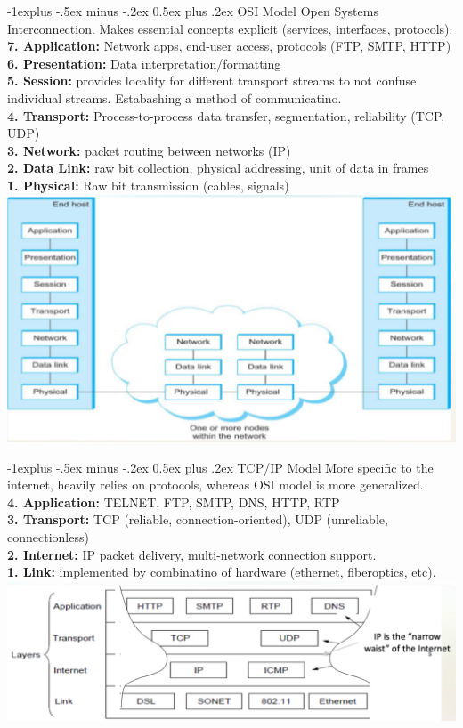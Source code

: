 \documentclass[letterpaper, 8pt]{extarticle}
\makeatletter
\renewcommand{\subsection}{\@startsection{subsection}{2}{0mm}%
                                {-1explus -.5ex minus -.2ex}%
                                {0.5ex plus .2ex}%
                                {\normalfont\small\bfseries}}
\makeatother
\begin{document}
\begin{multicols*}{4}
	\subsection{OSI Model}
	Open Systems Interconnection. Makes essential concepts explicit (services, interfaces, protocols). \\
	\textbf{7. Application:} Network apps, end-user access, protocols (FTP, SMTP, HTTP) \\
	\textbf{6. Presentation:} Data interpretation/formatting \\
	\textbf{5. Session:} provides locality for different transport streams to not confuse individual streams. Estabashing a method of communicatino. \\
	\textbf{4. Transport:} Process-to-process data transfer, segmentation, reliability (TCP, UDP) \\
	\textbf{3. Network:} packet routing between networks (IP) \\
	\textbf{2. Data Link:} raw bit collection, physical addressing, unit of data in frames \\
	\textbf{1. Physical:} Raw bit transmission (cables, signals)
	\includegraphics[width=\linewidth]{SCR-20250416-ucdl.png}

	\subsection{TCP/IP Model}
	More specific to the internet, heavily relies on protocols, whereas OSI model is more generalized. \\
	\textbf{4. Application:} TELNET, FTP, SMTP, DNS, HTTP, RTP \\
	\textbf{3. Transport:} TCP (reliable, connection-oriented), UDP (unreliable, connectionless) \\
	\textbf{2. Internet:} IP packet delivery, multi-network connection support. \\
	\textbf{1. Link:} implemented by combinatino of hardware (ethernet, fiberoptics, etc).
	\includegraphics[width=\linewidth]{SCR-20250416-udrs.png}


\end{multicols*}
\end{document}

